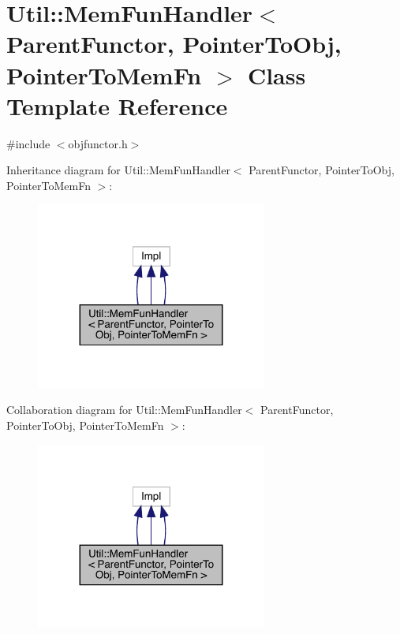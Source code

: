 \hypertarget{classUtil_1_1MemFunHandler}{}\section{Util\+:\+:Mem\+Fun\+Handler$<$ Parent\+Functor, Pointer\+To\+Obj, Pointer\+To\+Mem\+Fn $>$ Class Template Reference}
\label{classUtil_1_1MemFunHandler}


{\ttfamily \#include $<$objfunctor.\+h$>$}



Inheritance diagram for Util\+:\+:Mem\+Fun\+Handler$<$ Parent\+Functor, Pointer\+To\+Obj, Pointer\+To\+Mem\+Fn $>$\+:
\nopagebreak
\begin{figure}[H]
\begin{center}
\leavevmode
\includegraphics[width=215pt]{d8/d92/classUtil_1_1MemFunHandler__inherit__graph}
\end{center}
\end{figure}


Collaboration diagram for Util\+:\+:Mem\+Fun\+Handler$<$ Parent\+Functor, Pointer\+To\+Obj, Pointer\+To\+Mem\+Fn $>$\+:
\nopagebreak
\begin{figure}[H]
\begin{center}
\leavevmode
\includegraphics[width=215pt]{de/d23/classUtil_1_1MemFunHandler__coll__graph}
\end{center}
\end{figure}
